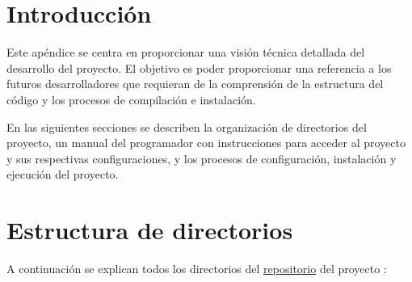 
\section{Introducción}
Este apéndice se centra en proporcionar una visión técnica detallada del desarrollo del proyecto. El objetivo es poder proporcionar una referencia a los futuros desarrolladores que requieran de la comprensión de la estructura del código y los procesos de compilación e instalación.

En las siguientes secciones se describen la organización de directorios del proyecto, un manual del programador con instrucciones para acceder al proyecto y sus respectivas configuraciones, y los procesos de configuración, instalación y ejecución del proyecto.

\section{Estructura de directorios}
A continuación se explican todos los directorios del \href{https://github.com/jpg1011/TFG-GestorTareasMoodle}{repositorio} del proyecto \cite{flutter_estructura}:

